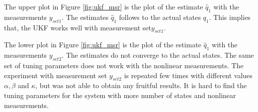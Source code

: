 The upper plot in Figure \ref{fig:ukf_msr} is the plot of the estimate $\hat q_1$ with the measurements $y_{set1}$. The estimates $\hat q_1$ follows to the actual states $q_1$. This implies that, the UKF works well with measurement set$y_{set1}$.

The lower plot in Figure \ref{fig:ukf_msr} is the plot of the estimate $\hat q_1$ with the measurements $y_{set2}$.  The estimates do not converge to the actual states. The same set of tuning parameters does not work with the nonlinear measurements. The experiment with measurement set $y_{set2}$ is repeated few times with different values $\alpha, \beta$ and $\kappa$, but was not able to obtain any fruitful results. It is hard to find the tuning parameters for the system with more number of states and nonlinear measurements.

